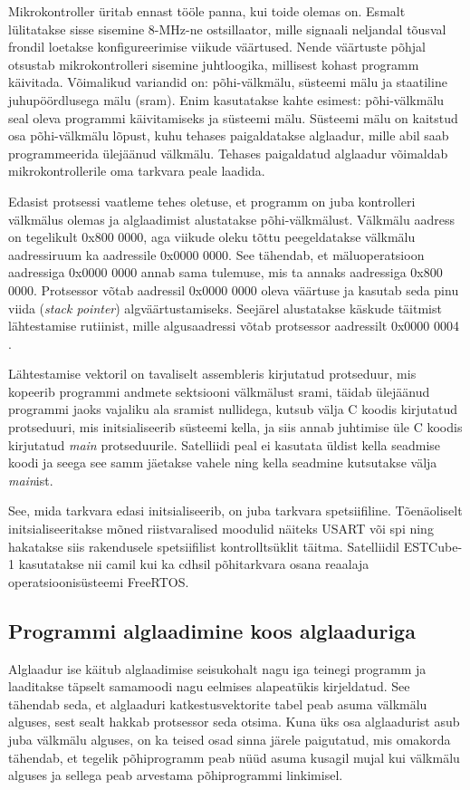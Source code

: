 \documentclass[12pt,a4paper]{article}
\begin{document}
Mikrokontroller üritab ennast tööle panna, kui toide olemas on. Esmalt
lülitatakse sisse sisemine 8-MHz-ne ostsillaator, mille signaali neljandal
tõus\-val frondil loetakse konfigureerimise viikude väärtused. Nende väärtuste
põh\-jal otsustab mikrokontrolleri sisemine juhtloogika, millisest kohast programm
käivitada. Võimalikud variandid on: põhi-välkmälu, süsteemi mälu ja staatiline
juhupöördlusega mälu (\gls{sram}).  Enim kasutatakse kahte esimest:
põhi-välkmälu seal oleva programmi käivitamiseks ja süsteemi mälu. Süsteemi mälu
on kaitstud osa põhi-välkmälu lõpust, kuhu tehases paigaldatakse alglaadur,
mille abil saab programmeerida ülejäänud välkmälu. Tehases paigaldatud alglaadur
võimaldab mikrokontrollerile oma tarkvara peale laadida.

Edasist protsessi vaatleme tehes oletuse, et programm on juba kontrolleri
välkmälus olemas ja alglaadimist alustatakse põhi-välkmälust. Välkmälu aadress
on tegelikult 0x800 0000, aga viikude oleku tõttu peegeldatakse välkmälu
aadressiruum ka aadressile 0x0000 0000. See tähendab, et mälu\-ope\-rat\-sioon
aadressiga 0x0000 0000 annab sama tulemuse, mis ta annaks aadressiga 0x800 0000.
Protsessor võtab aadressil 0x0000 0000 oleva väärtuse ja kasutab seda pinu viida
(\textit{stack pointer}) algväärtustamiseks. Seejärel alustatakse käskude
täitmist lähtestamise rutiinist, mille algusaadressi võtab protsessor aadressilt
0x0000 0004 \cite{f1rm}.

Lähtestamise vektoril on tavaliselt assembleris kirjutatud protseduur, mis
kopeerib programmi andmete sektsiooni välkmälust \gls{sram}i, täidab ülejäänud
programmi jaoks vajaliku ala \gls{sram}ist nullidega, kutsub välja C koodis
kirjutatud protseduuri, mis initsialiseerib süsteemi kella, ja siis annab
juhtimise üle C koodis kirjutatud \textit{main} protseduurile. Satelliidi peal
ei kasutata üldist kella seadmise koodi ja seega see samm jäetakse vahele ning
kella seadmine kutsutakse välja \textit{main}ist.

See, mida tarkvara edasi initsialiseerib, on juba tarkvara spetsiifiline.
Tõenäoliselt initsialiseeritakse mõned riistvaralised moodulid näiteks USART või
\gls{spi} ning hakatakse siis rakendusele spetsiifilist kontrolltsüklit täitma.
Satelliidil ESTCube-1 kasutatakse nii \gls{cam}il kui ka \gls{cdhs}il
põhitarkvara osana reaalaja operatsioonisüsteemi FreeRTOS.

\subsection{Programmi alglaadimine koos alglaaduriga}
Alglaadur ise käitub alglaadimise seisukohalt nagu iga teinegi programm ja
laaditakse täpselt samamoodi nagu eelmises alapeatükis kirjeldatud. See tähendab
seda, et alglaaduri katkestusvektorite tabel peab asuma välkmälu alguses, sest
sealt hakkab protsessor seda otsima. Kuna üks osa alglaadurist asub juba
välkmälu alguses, on ka teised osad sinna järele paigutatud, mis omakorda
tähendab, et tegelik põhiprogramm peab nüüd asuma kusagil mujal kui välkmälu
alguses ja sellega peab arvestama põhiprogrammi linkimisel.
\end{document}
